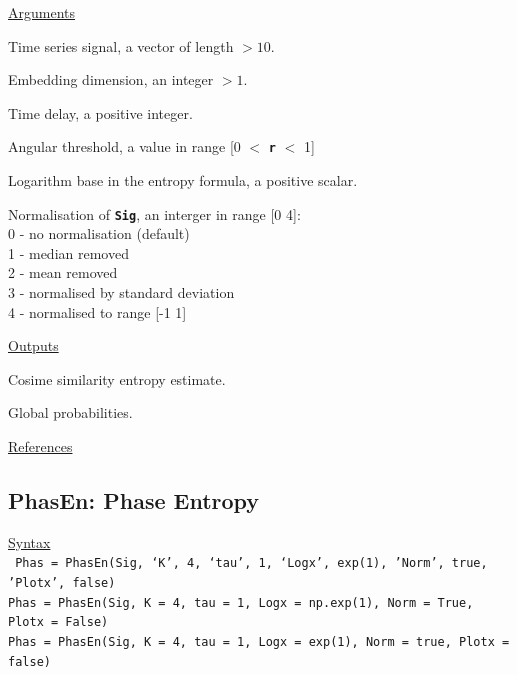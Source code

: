 \documentclass[12pt, a4paper, titlepage, openany]{book}
\begin{document}
\noindent \ul{Arguments}
\begin{description}[labelsep=1cm, labelwidth=2cm, nosep, style=multiline,leftmargin=3cm]\footnotesize
\item[\texttt{Sig}]		Time series signal, a vector of length $> 10$.
\item[\texttt{m}]		Embedding dimension, an integer $> 1$.
\item[\texttt{tau}]		Time delay, a positive integer.
\item[\texttt{r}]		Angular threshold, a value in range [0 $<$ \texttt{\textbf{r}} $<$ 1]
\item[\texttt{Logx}]	Logarithm base in the entropy formula, a positive scalar.
\item[\texttt{Norm}]	Normalisation of \texttt{\textbf{Sig}}, an interger in range [0 4]:\\
						0 - no normalisation (default)\\
						1 - median removed\\
						2 - mean removed\\
						3 - normalised by standard deviation\\
						4 - normalised to range [-1 1]
\end{description}

\noindent \ul{Outputs}
\begin{description}[labelsep=1cm, labelwidth=2cm, nosep, style=multiline,leftmargin=3cm]\footnotesize
\item[\texttt{CoSi}]	Cosime similarity entropy  estimate.
\item[\texttt{Bm}]	Global probabilities.
\end{description}

\noindent \ul{References}\hspace{1cm}
\cite{CoSi1}



\newpage
\subsection{\normalsize PhasEn: \hspace{15mm} Phase Entropy}\label{PhasEn}
\noindent\ul{Syntax} \vspace{6mm} \\ \noindent \texttt{\footnotesize
Phas = PhasEn(Sig, ‘K’, 4, ‘tau’, 1, ‘Logx’, exp(1), 'Norm', true, 'Plotx', false) \\
Phas = PhasEn(Sig, K = 4, tau = 1, Logx = np.exp(1), Norm = True, Plotx = False) \\
Phas = PhasEn(Sig, K = 4, tau = 1, Logx = exp(1), Norm = true, Plotx = false)}
\end{document}
